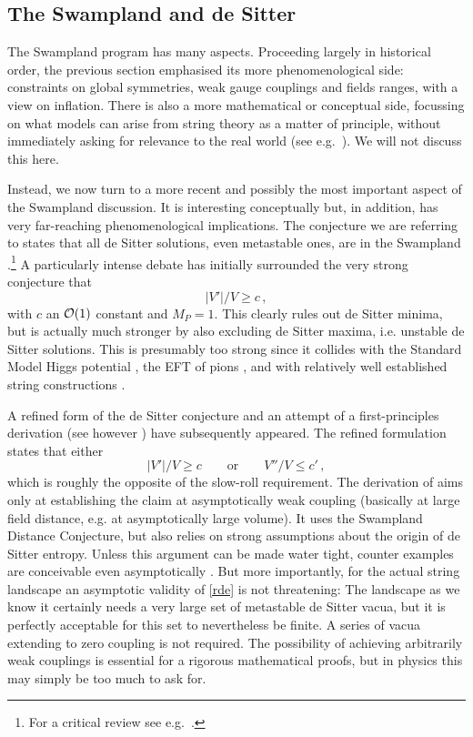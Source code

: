 \documentclass[12pt]{article}
\newcommand{\be}{\begin{equation}}
\newcommand{\ee}{\end{equation}}
\numberwithin{equation}{section}
\begin{document}
\subsection{The Swampland and de Sitter}\label{swds}

The Swampland program has many aspects. Proceeding largely in historical order, the previous section emphasised its more phenomenological side: constraints on global symmetries, weak gauge couplings and fields ranges, with a view on inflation. There is also a more mathematical or conceptual side, focussing on what models can arise from string theory as a matter of principle, without immediately asking for relevance to the real world (see e.g.~\cite{Brennan:2017rbf}). We will not discuss this here. 

Instead, we now turn to a more recent and possibly the most important aspect of the Swampland discussion. It is interesting conceptually but, in addition, has very far-reaching phenomenological implications. The conjecture we are referring to states that all de Sitter solutions, even metastable ones, are in the Swampland \cite{Danielsson:2018ztv, Obied:2018sgi, Garg:2018reu, Ooguri:2018wrx}.\footnote{
For
a critical review see e.g.~\cite{Akrami:2018ylq}.
} 
A particularly intense debate has initially surrounded the very strong conjecture that \cite{Obied:2018sgi}
\be
|V'|/V\ge c\,, \label{dec}
\ee
with $c$ an ${\cal O}(1)$ constant and $M_P=1$. This clearly rules out de Sitter minima, but is actually much stronger by also excluding de Sitter maxima, i.e. unstable de Sitter solutions. This is presumably too strong since it collides with the Standard Model Higgs potential \cite{Denef:2018etk, Cicoli:2018kdo}, the EFT of pions \cite{Choi:2018rze}, and with relatively well established string constructions \cite{Conlon:2018eyr}.

A refined form of the de Sitter conjecture \cite{
Garg:2018reu, Ooguri:2018wrx} and an attempt of a first-principles derivation \cite{Ooguri:2018wrx} (see however \cite{Hebecker:2018vxz, Junghans:2018gdb}) have subsequently appeared. The refined formulation states that either
\be
|V'|/V \ge c\qquad \mbox{or}\qquad V''/V \le c'\,, \label{rde}
\ee
which is roughly the opposite of the slow-roll requirement. The derivation of \cite{Ooguri:2018wrx} aims only at establishing the claim at asymptotically weak coupling (basically at large field distance, e.g. at asymptotically large volume). It uses the Swampland Distance Conjecture, but also relies on strong assumptions about the origin of de Sitter entropy. Unless this argument can be made water tight, counter examples are conceivable even asymptotically \cite{Hebecker:2018vxz, Junghans:2018gdb}. But more importantly, for the actual string landscape an asymptotic validity of \eqref{rde} is not threatening: The landscape as we know it certainly needs a very large set of metastable de Sitter vacua, but it is perfectly acceptable for this set to nevertheless be finite. A series of vacua extending to zero coupling is not required. The possibility of achieving arbitrarily weak couplings is essential for a rigorous mathematical proofs, but in physics this may simply be too much to ask for.
\end{document}
